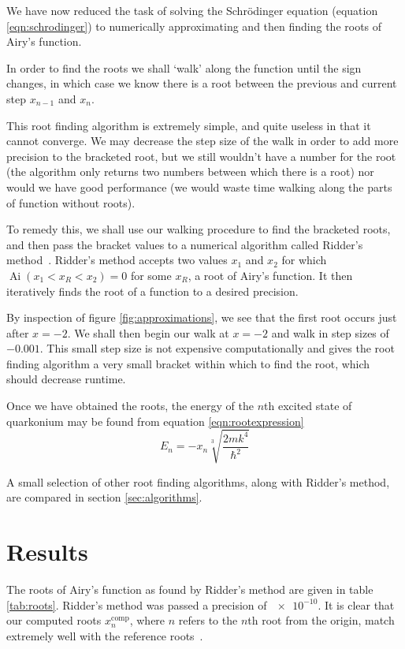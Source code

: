 \documentclass[]{article}
\newcommand{\Ai}[1]{\ensuremath{\operatorname{Ai}({#1})}}
\begin{document}
We have now reduced the task of solving the Schr\"{o}dinger equation (equation \ref{eqn:schrodinger}) to numerically approximating and then finding the roots of Airy's function.

In order to find the roots we shall `walk' along the function until the sign changes, in which case we know there is a root between the previous and current step $x_{n-1}$ and $x_{n}$.

This root finding algorithm is extremely simple, and quite useless in that it cannot converge. We may decrease the step size of the walk in order to add more precision to the bracketed root, but we still wouldn't have a number for the root (the algorithm only returns two numbers between which there is a root) nor would we have good performance (we would waste time walking along the parts of function without roots).

To remedy this, we shall use our walking procedure to find the bracketed roots, and then pass the bracket values to a numerical algorithm called Ridder's method~\cite{ref:nr}. Ridder's method accepts two values $x_{1}$ and $x_{2}$ for which $\Ai{x_{1} < x_{R} < x_{2}} = 0$ for some $x_{R}$, a root of Airy's function. It then iteratively finds the root of a function to a desired precision.

By inspection of figure \ref{fig:approximations}, we see that the first root occurs just after $x = -2$. We shall then begin our walk at $x = -2$ and walk in step sizes of $-0.001$. This small step size is not expensive computationally and gives the root finding algorithm a very small bracket within which to find the root, which should decrease runtime. 

Once we have obtained the roots, the energy of the $n$th excited state of quarkonium may be found from equation \ref{eqn:rootexpression}
\begin{equation}
E_{n} = -x_{n} \sqrt[3]{\frac{2mk^{4}}{\hbar^{2}}}
\end{equation}

A small selection of other root finding algorithms, along with Ridder's method, are compared in section \ref{sec:algorithms}.



\section{Results}\label{sec:results}

The roots of Airy's function as found by Ridder's method are given in table \ref{tab:roots}.   Ridder's method was passed a precision of $\num{e-10}$. It is clear that our computed roots $x_{n}^{\mathrm{comp}}$, where $n$ refers to the $n$th root from the origin, match extremely well with the reference roots~\cite{ref:abramowitz}.
\end{document}
